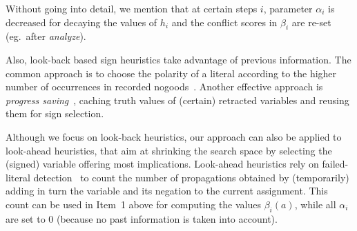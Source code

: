 Without going into detail, 
we mention that at certain steps $i$,
parameter $\alpha_i$ is decreased for decaying the values of $h_i$ and
the conflict scores in $\beta_i$ are re-set (eg.~after \textit{analyze}).

Also, look-back based sign heuristics take advantage of previous information.
The common approach is to choose the polarity of a literal according to the higher
number of occurrences in recorded nogoods~\cite{momazhzhma01a}.
Another effective approach is \emph{progress saving}~\cite{pipdar07a},
caching truth values of (certain) retracted variables and reusing them for sign selection.

Although we focus on look-back heuristics,
our approach can also be applied to look-ahead heuristics, that 
aim at shrinking the search space by selecting the (signed) variable offering most implications.
Look-ahead heuristics rely 
on failed-literal detection~\cite{freeman95a} to count the number of
propagations obtained by (temporarily) adding in turn the variable and its negation to the current
assignment.
This count can be used in Item~1 above for computing the values $\beta_i(a)$,
while all $\alpha_i$ are set to 0 (because no past information is taken into account).

